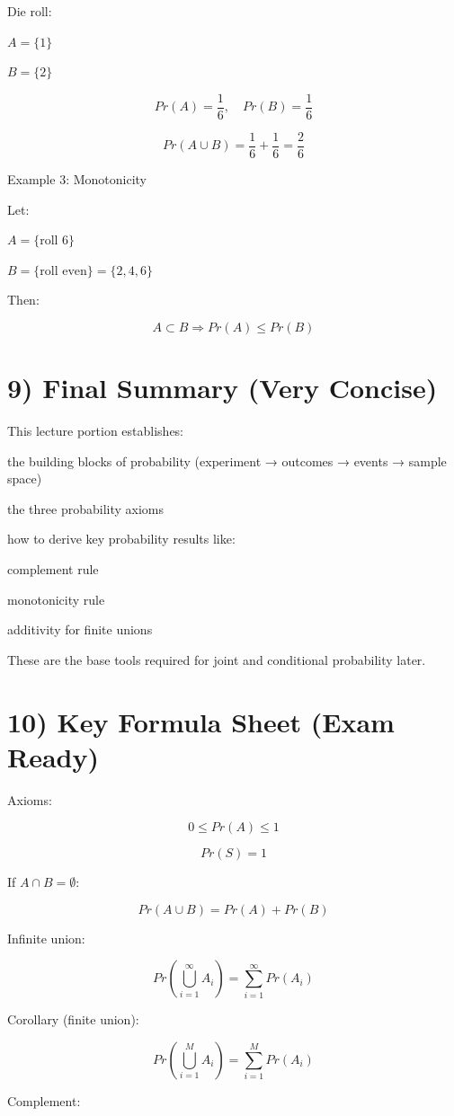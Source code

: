 \documentclass[12pt,a4paper]{article}
\begin{document}
Die roll:

$A = \{1\}$

$B = \{2\}$

\[
Pr(A)=\frac{1}{6}, \quad Pr(B)=\frac{1}{6}
\]

\[
Pr(A \cup B) = \frac{1}{6} + \frac{1}{6} = \frac{2}{6}
\]

Example 3: Monotonicity

Let:

$A = \{\text{roll 6}\}$

$B = \{\text{roll even}\} = \{2,4,6\}$

Then:

\[
A \subset B \Rightarrow Pr(A) \le Pr(B)
\]

\section*{9) Final Summary (Very Concise)}

This lecture portion establishes:

the building blocks of probability (experiment → outcomes → events → sample space)

the three probability axioms

how to derive key probability results like:

complement rule

monotonicity rule

additivity for finite unions

These are the base tools required for joint and conditional probability later.

\section*{10) Key Formula Sheet (Exam Ready)}

Axioms:

\[
0 \le Pr(A) \le 1
\]

\[
Pr(S)=1
\]

If $A \cap B = \emptyset$:

\[
Pr(A \cup B)=Pr(A)+Pr(B)
\]

Infinite union:

\[
Pr\left(\bigcup_{i=1}^{\infty} A_i\right)
=
\sum_{i=1}^{\infty} Pr(A_i)
\]

Corollary (finite union):

\[
Pr\left(\bigcup_{i=1}^{M} A_i\right)
=
\sum_{i=1}^{M} Pr(A_i)
\]

Complement:
\end{document}
